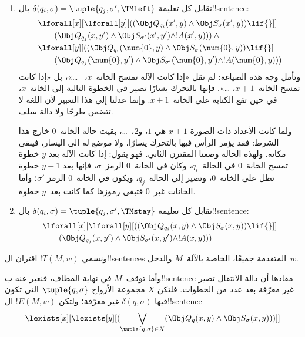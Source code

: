 \documentclass[../../../include/open-logic-section]{subfiles}
\begin{document}
\begin{enumerate}
\begin{enumerate}
\item {} نقابل كل تعليمة
$\delta(q_i,\sigma)=\tuple{q_j,\sigma',\TMleft}$ بال!!{sentence}:
\begin{align*}
& \lforall[x][\lforall[y][
    ((\Obj Q_{q_i}(x', y) \land \Obj S_{\sigma}(x', y)) \lif {}]]\\
& \qquad   (\Obj Q_{q_j}(x, y') \land \Obj S_{\sigma'}(x', y') \land
!A(x', y))) \land {}\\
& \lforall[y][((\Obj Q_{q_i}(\num{0}, y) \land \Obj S_{\sigma}(\num{0},
    y)) \lif {}]\\
& \qquad (\Obj Q_{q_j}(\num{0}, y') \land \Obj S_{\sigma'}(\num{0},
  y') \land !A(\num{0}, y)))
\end{align*}
وتأمل وجه هذه الصياغة: لم نقل «إذا كانت الآلة تمسح الخانة~$x$،
~\dots»، بل «إذا كانت تمسح الخانة~$x+1$، \dots». فإنها بالتحرك
يسارًا تصير في الخطوة التالية إلى الخانة~$x$، في حين تقع الكتابة
على الخانة~$x+1$. وإنما عدلنا إلى هذا التعبير لأن اللغة لا تتضمن
طرحًا ولا دالة سلف.

ولما كانت الأعداد ذات الصورة $x+1$ هي $1$، و$2$،~\dots،
بقيت حالة الخانة~$0$ خارج هذا الشرط: فقد يؤمر الرأس فيها بالتحرك
يسارًا، ولا موضع له إلى اليسار، فيبقى مكانه. ولهذه الحالة
وضعنا المقترن الثاني. فهو يقول: إذا كانت الآلة بعد $y$ خطوة
تمسح الخانة~$0$ في الحالة~$q_i$، وكان في الخانة~$0$
الرمز~$\sigma$، فإنها بعد $y+1$ خطوة تظل على الخانة~$0$،
وتصير إلى الحالة~$q_j$، ويكون في الخانة~$0$ الرمز
$\sigma'$؛ وأما الخانات غير~$0$ فتبقى رموزها كما كانت بعد~$y$
خطوة.
\item {} نقابل كل تعليمة
$\delta(q_i,\sigma)=\tuple{q_j,\sigma',\TMstay}$ بال!!{sentence}:
\begin{align*}
& \lforall[x][\lforall[y][(
   (\Obj Q_{q_i}(x, y) \land \Obj S_{\sigma}(x, y)) \lif {}]] \\
&\qquad   (\Obj Q_{q_j}(x, y') \land \Obj S_{\sigma'}(x, y') \land
!A(x, y)))
\end{align*}
\end{enumerate}
\end{enumerate}
ونسمي $!T(M,w)$ اقتران ال!!{sentence}s المتقدمة جميعًا، الخاصة
بالآلة~$M$ والدخل~$w$.

وأما توقف~$M$ في نهاية المطاف، فنعبر عنه ب!!{sentence}
مفادها أن دالة الانتقال تصير غير معرّفة بعد عدد من الخطوات.
فلتكن $X$ مجموعة الأزواج $\tuple{q,\sigma}$ التي تكون فيها
$\delta(q,\sigma)$ غير معرّفة؛ ولتكن $!E(M,w)$ ال!!{sentence}
\[
\lexists[x][\lexists[y][(\bigvee_{\tuple{q, \sigma} \in
      X}(\Obj Q_q(x, y) \land \Obj S_\sigma(x, y)))]]
\]
\end{document}
